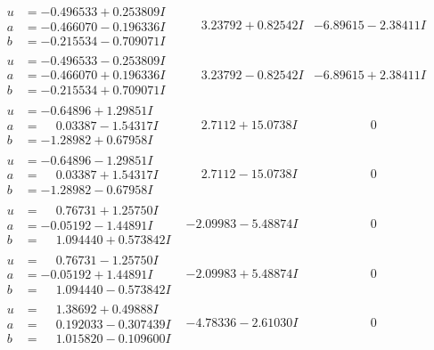 \documentclass[1p]{elsarticle_modified}
\theoremstyle{definition}
\begin{document}
$$\begin{array}{c|c|c}
\begin{aligned}
u &= -0.496533 + 0.253809 I \\
a &= -0.466070 - 0.196336 I \\
b &= -0.215534 - 0.709071 I\end{aligned}
 & \phantom{-}3.23792 + 0.82542 I & -6.89615 - 2.38411 I \\ \hline\begin{aligned}
u &= -0.496533 - 0.253809 I \\
a &= -0.466070 + 0.196336 I \\
b &= -0.215534 + 0.709071 I\end{aligned}
 & \phantom{-}3.23792 - 0.82542 I & -6.89615 + 2.38411 I \\ \hline\begin{aligned}
u &= -0.64896 + 1.29851 I \\
a &= \phantom{-}0.03387 - 1.54317 I \\
b &= -1.28982 + 0.67958 I\end{aligned}
 & \phantom{-}2.7112 + 15.0738 I & \phantom{-0.000000 } 0 \\ \hline\begin{aligned}
u &= -0.64896 - 1.29851 I \\
a &= \phantom{-}0.03387 + 1.54317 I \\
b &= -1.28982 - 0.67958 I\end{aligned}
 & \phantom{-}2.7112 - 15.0738 I & \phantom{-0.000000 } 0 \\ \hline\begin{aligned}
u &= \phantom{-}0.76731 + 1.25750 I \\
a &= -0.05192 - 1.44891 I \\
b &= \phantom{-}1.094440 + 0.573842 I\end{aligned}
 & -2.09983 - 5.48874 I & \phantom{-0.000000 } 0 \\ \hline\begin{aligned}
u &= \phantom{-}0.76731 - 1.25750 I \\
a &= -0.05192 + 1.44891 I \\
b &= \phantom{-}1.094440 - 0.573842 I\end{aligned}
 & -2.09983 + 5.48874 I & \phantom{-0.000000 } 0 \\ \hline\begin{aligned}
u &= \phantom{-}1.38692 + 0.49888 I \\
a &= \phantom{-}0.192033 - 0.307439 I \\
b &= \phantom{-}1.015820 - 0.109600 I\end{aligned}
 & -4.78336 - 2.61030 I & \phantom{-0.000000 } 0 \\ \hline\begin{aligned}

\end{aligned}
\end{array}$$
\end{document}
